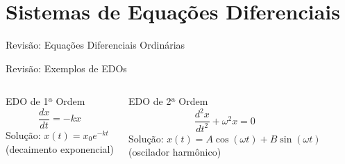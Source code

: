 \section{Sistemas de Equações Diferenciais}

\begin{frame}{Revisão: Equações Diferenciais Ordinárias}

\vspace{0.6cm}

\end{frame}

\begin{frame}{Revisão: Exemplos de EDOs}
\begin{columns}
\begin{exampleblock}{EDO de 1ª Ordem}
\begin{equation*}
\frac{dx}{dt} = -kx
\end{equation*}
Solução: $x(t) = x_0 e^{-kt}$\\
(decaimento exponencial)
\end{exampleblock}

\begin{exampleblock}{EDO de 2ª Ordem}
\begin{equation*}
\frac{d^2x}{dt^2} + \omega^2 x = 0
\end{equation*}
Solução: $x(t) = A\cos(\omega t) + B\sin(\omega t)$\\
(oscilador harmônico)
\end{exampleblock}
\end{columns}
\end{frame}

